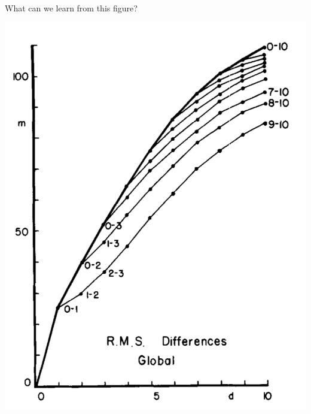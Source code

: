 \documentclass[aspectratio=169]{beamer}
\begin{document}
\begin{frame}

What can we learn from this figure?

\begin{center}
\includegraphics[height = 0.8\textheight]{figures/lorenz_atmospheric_1982_fig1}
\end{center}

\end{frame}
\frame{\titlepage}
\end{document}
